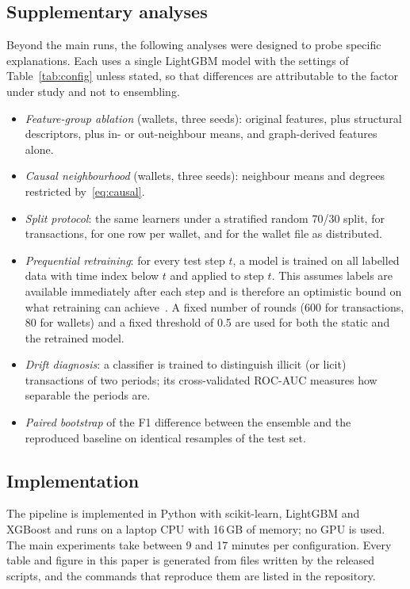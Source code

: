 \subsection{Supplementary analyses}
Beyond the main runs, the following analyses were designed to probe specific explanations. Each uses a single LightGBM model with the settings of Table~\ref{tab:config} unless stated, so that differences are attributable to the factor under study and not to ensembling.
\begin{itemize}
\item \emph{Feature-group ablation} (wallets, three seeds): original features, plus structural descriptors, plus in- or out-neighbour means, and graph-derived features alone.
\item \emph{Causal neighbourhood} (wallets, three seeds): neighbour means and degrees restricted by~\eqref{eq:causal}.
\item \emph{Split protocol}: the same learners under a stratified random 70/30 split, for transactions, for one row per wallet, and for the wallet file as distributed.
\item \emph{Prequential retraining}: for every test step $t$, a model is trained on all labelled data with time index below $t$ and applied to step $t$. This assumes labels are available immediately after each step and is therefore an optimistic bound on what retraining can achieve~\cite{dalpozzolo2018}. A fixed number of rounds (600 for transactions, 80 for wallets) and a fixed threshold of 0.5 are used for both the static and the retrained model.
\item \emph{Drift diagnosis}: a classifier is trained to distinguish illicit (or licit) transactions of two periods; its cross-validated ROC-AUC measures how separable the periods are.
\item \emph{Paired bootstrap} of the F1 difference between the ensemble and the reproduced baseline on identical resamples of the test set.
\end{itemize}

\subsection{Implementation}
The pipeline is implemented in Python with scikit-learn, LightGBM and XGBoost and runs on a laptop CPU with 16\,GB of memory; no GPU is used. The main experiments take between 9 and 17 minutes per configuration. Every table and figure in this paper is generated from files written by the released scripts, and the commands that reproduce them are listed in the repository.
